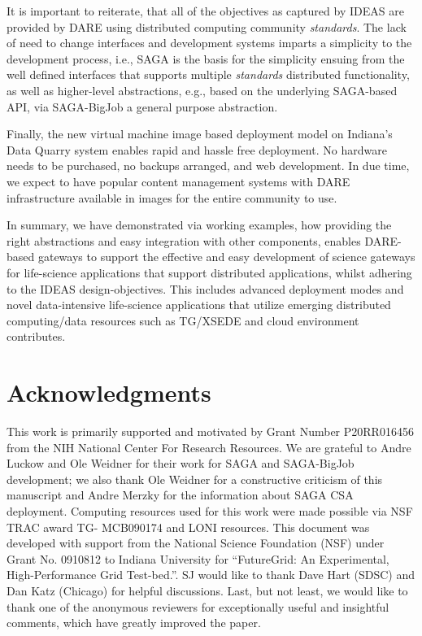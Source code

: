 \documentclass[]{svjour3}
\begin{document}
It is important to reiterate, that all of the objectives as captured
by IDEAS are provided by DARE using distributed computing community
{\it standards}. The lack of need to change interfaces and development
systems imparts a simplicity to the development process, i.e., SAGA is
the basis for the simplicity ensuing from the well defined interfaces
that supports multiple {\it standards} distributed functionality, as
well as higher-level abstractions, e.g., based on the underlying
SAGA-based API, via SAGA-BigJob a general purpose \pilotjob
abstraction.

Finally, the new virtual machine image based deployment model on
Indiana's Data Quarry system enables rapid and hassle free
deployment. No hardware needs to be purchased, no backups arranged,
and web development. In due time, we expect to have popular content
management systems with DARE infrastructure available in images for
the entire community to use.

In summary, we have demonstrated via working examples, how providing
the right abstractions and easy integration with other components,
enables DARE-based gateways to support the effective and easy
development of science gateways for life-science applications that
support distributed applications, whilst adhering to the IDEAS
design-objectives. This includes advanced deployment modes and novel
data-intensive life-science applications that utilize emerging
distributed computing/data resources such as TG/XSEDE and cloud
environment contributes.

\section*{Acknowledgments}
This work is primarily supported and motivated by Grant Number
P20RR016456 from the NIH National Center For Research Resources. We
are grateful to Andre Luckow and Ole Weidner for their work for SAGA
and SAGA-BigJob development; we also thank Ole Weidner for a
constructive criticism of this manuscript and Andre Merzky for the
information about SAGA CSA deployment. Computing resources used for
this work were made possible via NSF TRAC award TG- MCB090174 and LONI
resources. This document was developed with support from the National
Science Foundation (NSF) under Grant No. 0910812 to Indiana University
for ``FutureGrid: An Experimental, High-Performance Grid
Test-bed.''. SJ would like to thank Dave Hart (SDSC) and Dan Katz
(Chicago) for helpful discussions. Last, but not least, we would like
to thank one of the anonymous reviewers for exceptionally useful and
insightful comments, which have greatly improved the paper. 


%
%



\end{document}
